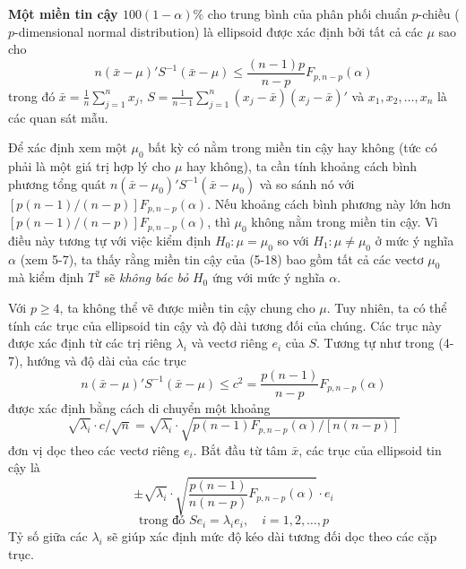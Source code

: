 \textbf{Một miền tin cậy $100(1 - \alpha)\%$} cho trung bình của phân phối chuẩn $p$-chiều ($p$-dimensional normal distribution) là ellipsoid được xác định bởi tất cả các $\mu$ sao cho
\begin{equation}
n(\bar{x} - \mu)'S^{-1}(\bar{x} - \mu) \le \frac{(n-1)p}{n-p} F_{p, n-p}(\alpha) \tag{5-18}
\end{equation}
trong đó $\bar{x} = \frac{1}{n} \sum_{j=1}^n x_j$, $S = \frac{1}{n-1} \sum_{j=1}^n (x_j - \bar{x})(x_j - \bar{x})'$ và $x_1, x_2, \dots, x_n$ là các quan sát mẫu.

Để xác định xem một $\mu_0$ bất kỳ có nằm trong miền tin cậy hay không (tức có phải là một giá trị hợp lý cho $\mu$ hay không), ta cần tính khoảng cách bình phương tổng quát $n(\bar{x} - \mu_0)'S^{-1}(\bar{x} - \mu_0)$ và so sánh nó với $[p(n - 1)/(n - p)]F_{p,n-p}(\alpha)$. Nếu khoảng cách bình phương này lớn hơn $[p(n - 1)/(n - p)]F_{p,n-p}(\alpha)$, thì $\mu_0$ không nằm trong miền tin cậy. Vì điều này tương tự với việc kiểm định $H_0: \mu = \mu_0$ so với $H_1: \mu \neq \mu_0$ ở mức ý nghĩa $\alpha$ (xem 5-7), ta thấy rằng miền tin cậy của (5-18) bao gồm tất cả các vectơ $\mu_0$ mà kiểm định $T^2$ sẽ \textit{không bác bỏ} $H_0$ ứng với mức ý nghĩa $\alpha$.

Với $p \ge 4$, ta không thể vẽ được miền tin cậy chung cho $\mu$. Tuy nhiên, ta có thể tính các trục của ellipsoid tin cậy và độ dài tương đối của chúng. Các trục này được xác định từ các trị riêng $\lambda_i$ và vectơ riêng $e_i$ của $S$. Tương tự như trong (4-7), hướng và độ dài của các trục
\begin{equation*}
n(\bar{x} - \mu)'S^{-1}(\bar{x} - \mu) \le c^2 = \frac{p(n-1)}{n-p} F_{p, n-p}(\alpha)
\end{equation*}
được xác định bằng cách di chuyển một khoảng
\begin{equation*}
\sqrt{\lambda_i} \cdot c/\sqrt{n} = \sqrt{\lambda_i} \cdot \sqrt{p(n - 1)F_{p, n-p}(\alpha)/[n(n - p)]}
\end{equation*}
đơn vị dọc theo các vectơ riêng $e_i$. Bắt đầu từ tâm $\bar{x}$, các trục của ellipsoid tin cậy là
\begin{equation*}
\pm \sqrt{\lambda_i} \cdot \sqrt{\frac{p(n-1)}{n(n-p)} F_{p, n-p}(\alpha)} \cdot e_i
\end{equation*}
\begin{equation}
\text{trong đó } Se_i = \lambda_i e_i, \quad i = 1, 2, \dots, p \tag{5-19}
\end{equation}
Tỷ số giữa các $\lambda_i$ sẽ giúp xác định mức độ kéo dài tương đối dọc theo các cặp trục.

